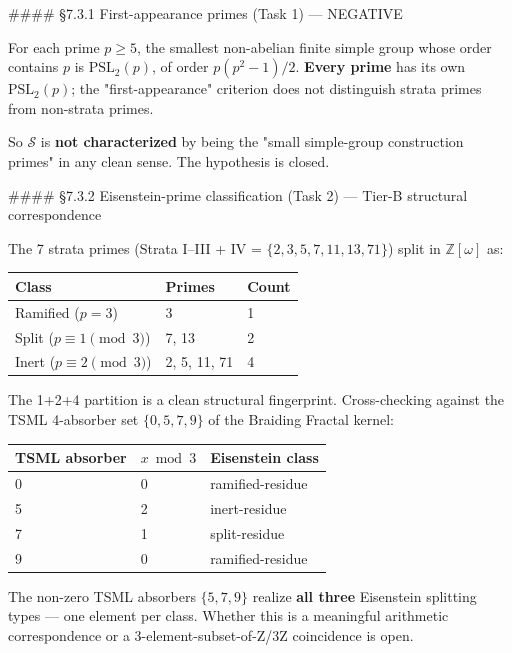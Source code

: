 \documentclass[11pt,reqno]{amsart}
\theoremstyle{plain}
\theoremstyle{definition}
\begin{document}
#### §7.3.1 First-appearance primes (Task 1) --- NEGATIVE

For each prime $p \geq 5$, the smallest non-abelian finite simple group whose order contains $p$ is $\mathrm{PSL}_2(p)$, of order $p(p^2-1)/2$. \textbf{Every prime} has its own $\mathrm{PSL}_2(p)$; the "first-appearance" criterion does not distinguish strata primes from non-strata primes.

So $\mathcal{S}$ is \textbf{not characterized} by being the "small simple-group construction primes" in any clean sense. The hypothesis is closed.

#### §7.3.2 Eisenstein-prime classification (Task 2) --- Tier-B structural correspondence

The 7 strata primes (Strata I–III + IV = $\{2,3,5,7,11,13,71\}$) split in $\mathbb{Z}[\omega]$ as:

\begin{center}
\begin{tabular}{lll}
\toprule
Class & Primes & Count \\
\midrule
Ramified ($p = 3$) & {3} & 1 \\
Split ($p \equiv 1 \pmod 3$) & {7, 13} & 2 \\
Inert ($p \equiv 2 \pmod 3$) & {2, 5, 11, 71} & 4 \\
\bottomrule
\end{tabular}
\end{center}

The 1+2+4 partition is a clean structural fingerprint. Cross-checking against the TSML 4-absorber set $\{0, 5, 7, 9\}$ of the Braiding Fractal kernel:

\begin{center}
\begin{tabular}{lll}
\toprule
TSML absorber & $x \bmod 3$ & Eisenstein class \\
\midrule
0 & 0 & ramified-residue \\
5 & 2 & inert-residue \\
7 & 1 & split-residue \\
9 & 0 & ramified-residue \\
\bottomrule
\end{tabular}
\end{center}

The non-zero TSML absorbers $\{5, 7, 9\}$ realize \textbf{all three} Eisenstein splitting types --- one element per class. Whether this is a meaningful arithmetic correspondence or a 3-element-subset-of-Z/3Z coincidence is open.
\end{document}
